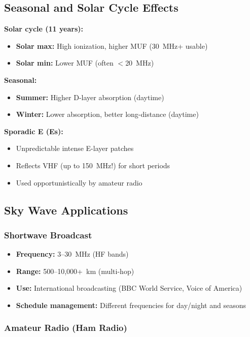 \subsection{Seasonal and Solar Cycle Effects}

\textbf{Solar cycle (11 years):}
\begin{itemize}
\item \textbf{Solar max:} High ionization, higher MUF (30~MHz+ usable)
\item \textbf{Solar min:} Lower MUF (often $<$20~MHz)
\end{itemize}

\textbf{Seasonal:}
\begin{itemize}
\item \textbf{Summer:} Higher D-layer absorption (daytime)
\item \textbf{Winter:} Lower absorption, better long-distance (daytime)
\end{itemize}

\textbf{Sporadic E (Es):}
\begin{itemize}
\item Unpredictable intense E-layer patches
\item Reflects VHF (up to 150~MHz!) for short periods
\item Used opportunistically by amateur radio
\end{itemize}

\subsection{Sky Wave Applications}

\subsubsection{Shortwave Broadcast}

\begin{itemize}
\item \textbf{Frequency:} 3--30~MHz (HF bands)
\item \textbf{Range:} 500--10,000+~km (multi-hop)
\item \textbf{Use:} International broadcasting (BBC World Service, Voice of America)
\item \textbf{Schedule management:} Different frequencies for day/night and seasons
\end{itemize}

\subsubsection{Amateur Radio (Ham Radio)}

